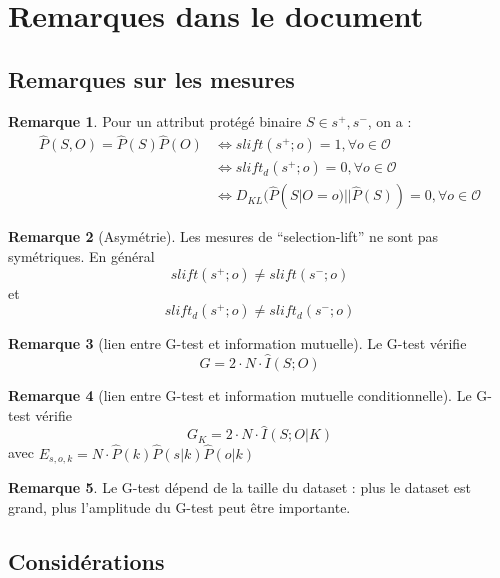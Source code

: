 \documentclass{article}
\theoremstyle{definition}
\newtheorem{myRem}{Remarque}
\begin{document}
\section{Remarques dans le document}

\subsection{Remarques sur les mesures}

\begin{myRem}
  Pour un attribut protégé binaire $S \in {s^{+}, s^{-}}$, on a :
  \begin{align*}
    \hat{P}(S,O) = \hat{P}(S) \hat{P}(O)
    &\Longleftrightarrow slift(s^{+};o) = 1, \forall o \in \mathcal{O} \\
    &\Longleftrightarrow slift_{d}(s^{+};o) = 0, \forall o \in \mathcal{O} \\
    &\Longleftrightarrow D_{KL}(\hat{P}(S|O = o) || \hat{P}(S)) = 0, \forall o \in \mathcal{O}
  \end{align*}
\end{myRem}

\begin{myRem}[Asymétrie]
  Les mesures de ``selection-lift'' ne sont pas symétriques. En général
  \[
  slift(s^{+};o) \neq slift(s^{-};o)
  \]
  et
  \[
  slift_{d}(s^{+};o) \neq slift_{d}(s^{-};o)
  \]
\end{myRem}

\begin{myRem}[lien entre G-test et information mutuelle]
  Le G-test vérifie
  \[
  G = 2 \cdot N \cdot \hat{I}(S;O)
  \]
\end{myRem}

\begin{myRem}[lien entre G-test et information mutuelle conditionnelle]
  Le G-test vérifie
  \[
  G_{K} = 2 \cdot N \cdot \hat{I}(S;O|K)
  \]
  avec $E_{s,o,k} = N \cdot \hat{P}(k) \hat{P}(s|k) \hat{P}(o|k)$
\end{myRem}

\begin{myRem}
  Le G-test dépend de la taille du dataset : plus le dataset est grand, plus l'amplitude du G-test peut être importante.
\end{myRem}

\subsection{Considérations}
\end{document}
